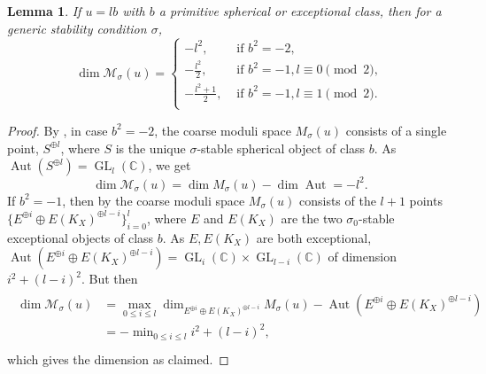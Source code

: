 \documentclass[leqno,11pt]{amsart}
\def\C{\ensuremath{\mathbb{C}}}
\def\Aut{\mathop{\mathrm{Aut}}\nolimits}
\def\dim{\mathop{\mathrm{dim}}\nolimits}
\def\GL{\mathop{\mathrm{GL}}}
\def\min{\mathop{\mathrm{min}}\nolimits}
\newtheorem{Lem}[Thm]{Lemma}
\theoremstyle{definition}
\def\C{\ensuremath{\mathbb{C}}}
\def\MM{\ensuremath{\mathcal M}}
\begin{document}
\begin{Lem}\label{Lem:dimension negative}
If $u=lb$ with $b$ a primitive spherical or exceptional class, then for a generic stability condition $\sigma$, 
$$\dim\MM_{\sigma}(u)= \begin{cases}
 -l^2, & \text{ if }b^2=-2,\\

-\frac{l^2}{2}, & \text{ if }b^2=-1,l\equiv 0\pmod 2,\\

-\frac{l^2+1}{2}, & \text{ if }b^2=-1,l\equiv 1\pmod 2.\\
 \end{cases}$$
\end{Lem}
\begin{proof}
By \cite[Proposition 9.9]{Nue14b}, in case $b^2=-2$, the coarse moduli space $M_{\sigma}(u)$ consists of a single point, $S^{\oplus l}$, where $S$ is the unique $\sigma$-stable spherical object of class $b$.  As $\Aut(S^{\oplus l})=\GL_l(\C)$, we get $$\dim \MM_{\sigma}(u)=\dim M_{\sigma}(u)-\dim\Aut=-l^2.$$  If $b^2=-1$, then by \cite[Lemma 9.2]{Nue14b} the coarse moduli space $M_{\sigma}(u)$ consists of the $l+1$ points $\{E^{\oplus i}\oplus E(K_X)^{\oplus l-i}\}_{i=0}^l$, where $E$ and $E(K_X)$ are the two $\sigma_0$-stable exceptional objects of class $b$.  As $E,E(K_X)$ are both exceptional, $\Aut(E^{\oplus i}\oplus E(K_X)^{\oplus l-i})=\GL_i(\C)\times \GL_{l-i}(\C)$ of dimension $i^2+(l-i)^2$.  But then 
\begin{align}
\begin{split}\dim\MM_{\sigma}(u)&=\max_{0\leq i\leq l}\dim_{E^{\oplus i}\oplus E(K_X)^{\oplus l-i}} M_{\sigma}(u)-\Aut(E^{\oplus i}\oplus E(K_X)^{\oplus l-i})\\
&=-\min_{0\leq i\leq l} i^2+(l-i)^2,\\
\end{split}
\end{align}
which gives the dimension as claimed.
\end{proof}
\end{document}
